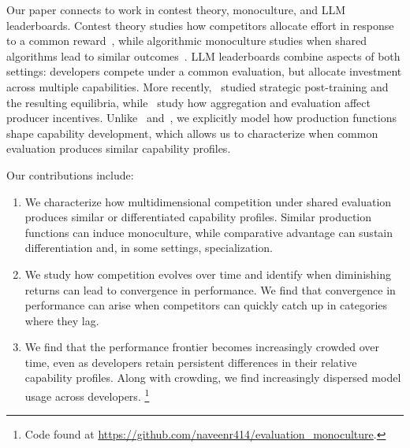 Our paper connects to work in contest theory, monoculture, and LLM leaderboards. 
Contest theory studies how competitors allocate effort in response to a common reward~\citep{contest_theory_book,colonel_blotto}, while algorithmic monoculture studies when shared algorithms lead to similar outcomes~\citep{monoculture_welfare,monoculture_matching}. 
LLM leaderboards combine aspects of both settings: developers compete under a common evaluation, but allocate investment across multiple capabilities. 
More recently,~\citet{leaderboard_incentives} studied strategic post-training and the resulting equilibria, while~\citet{aggregation_diversity} study how aggregation and evaluation affect producer incentives.
Unlike~\citet{leaderboard_incentives} and~\citet{aggregation_diversity}, we explicitly model how production functions shape capability development, which allows us to characterize when common evaluation produces similar capability profiles.

Our contributions include: 
\begin{enumerate}
    \item We characterize how multidimensional competition under shared evaluation produces similar or differentiated capability profiles. 
    Similar production functions can induce monoculture, while comparative advantage can sustain differentiation and, in some settings, specialization.
    \item We study how competition evolves over time and identify when diminishing returns can lead to convergence in performance. We find that convergence in performance can arise when competitors can quickly catch up in categories where they lag. 
    \item We find that the performance frontier becomes increasingly crowded over time, even as developers retain persistent differences in their relative capability profiles. Along with crowding, we find increasingly dispersed model usage across developers. \footnote{Code found at \url{https://github.com/naveenr414/evaluation_monoculture}.} 
\end{enumerate}